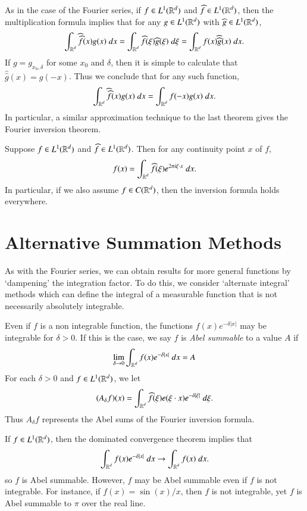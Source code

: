 As in the case of the Fourier series, if $f \in L^1(\operatorname{\mathbb{R}}^d)$ and $\widehat{f} \in L^1(\operatorname{\mathbb{R}}^d)$, then the multiplication formula implies that for any $g \in L^1(\operatorname{\mathbb{R}}^d)$ with $\widehat{g} \in L^1(\operatorname{\mathbb{R}}^d)$,
%
\[ \int_{\operatorname{\mathbb{R}}^d} \widehat{\widehat{f}}(x) g(x)\; dx = \int_{\operatorname{\mathbb{R}}^d} \widehat{f}(\xi) \widehat{g}(\xi)\; d\xi = \int_{\operatorname{\mathbb{R}}^d} f(x) \widehat{\widehat{g}}(x)\; dx. \]
%
If $g = g_{x_0,\delta}$ for some $x_0$ and $\delta$, then it is simple to calculate that $\widehat{\widehat{g}}(x) = g(-x)$. Thus we conclude that for any such function,
%
\[ \int_{\operatorname{\mathbb{R}}^d} \widehat{\widehat{f}}(x) g(x)\; dx = \int_{\operatorname{\mathbb{R}}^d} f(-x) g(x)\; dx. \]
%
In particular, a similar approximation technique to the last theorem gives the Fourier inversion theorem.

\begin{theorem}
    Suppose $f \in L^1(\operatorname{\mathbb{R}}^d)$ and $\widehat{f} \in L^1(\operatorname{\mathbb{R}}^d)$. Then for any continuity point $x$ of $f$,
    \[ f(x) = \int_{\operatorname{\mathbb{R}}^d} \widehat{f}(\xi) e^{2 \pi i \xi \cdot x}\; dx. \]
    In particular, if we also assume $f \in C(\operatorname{\mathbb{R}}^d)$, then the inversion formula holds everywhere.
\end{theorem}

\section{Alternative Summation Methods}

As with the Fourier series, we can obtain results for more general functions by `dampening' the integration factor. To do this, we consider `alternate integral' methods which can define the integral of a measurable function that is not necessarily absolutely integrable.

\begin{example}
    Even if $f$ is a non integrable function, the functions $f(x) e^{-\delta |x|}$ may be integrable for $\delta > 0$. If this is the case, we say $f$ is \emph{Abel summable} to a value $A$ if
    \[ \lim_{\delta \to 0} \int_{\operatorname{\mathbb{R}}^d} f(x) e^{-\delta |x|}\; dx = A \]
    For each $\delta > 0$ and $f \in L^1(\operatorname{\mathbb{R}}^d)$, we let
    \[ (A_\delta f)(x) = \int_{\operatorname{\mathbb{R}}^d} \widehat{f}(\xi) e(\xi \cdot x) e^{-\delta |\xi|}\; d\xi. \]
    Thus $A_\delta f$ represents the Abel sums of the Fourier inversion formula.
\end{example}

If $f \in L^1(\operatorname{\mathbb{R}}^d)$, then the dominated convergence theorem implies that
%
\[ \int_{\operatorname{\mathbb{R}}^d} f(x) e^{-\delta |x|}\; dx \to \int_{\operatorname{\mathbb{R}}^d} f(x)\; dx. \]
%
so $f$ is Abel summable. However, $f$ may be Abel summable even if $f$ is not integrable. For instance, if $f(x) = \sin(x)/x$, then $f$ is not integrable, yet $f$ is Abel summable to $\pi$ over the real line.

